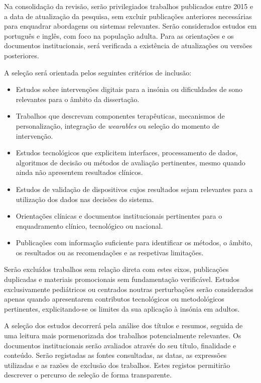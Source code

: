 Na consolidação da revisão, serão privilegiados trabalhos publicados entre 2015 e a data de atualização da pesquisa, sem excluir publicações anteriores necessárias para enquadrar abordagens ou sistemas relevantes. Serão considerados estudos em português e inglês, com foco na população adulta. Para as orientações e os documentos institucionais, será verificada a existência de atualizações ou versões posteriores.

A seleção será orientada pelos seguintes critérios de inclusão:

\begin{itemize}
	\item Estudos sobre intervenções digitais para a insónia ou dificuldades de sono relevantes para o âmbito da dissertação.
	\item Trabalhos que descrevam componentes terapêuticas, mecanismos de personalização, integração de \textit{wearables} ou seleção do momento de intervenção.
    \item Estudos tecnológicos que explicitem interfaces, processamento de dados, algoritmos de decisão ou métodos de avaliação pertinentes, mesmo quando ainda não apresentem resultados clínicos.
	\item Estudos de validação de dispositivos cujos resultados sejam relevantes para a utilização dos dados nas decisões do sistema.
	\item Orientações clínicas e documentos institucionais pertinentes para o enquadramento clínico, tecnológico ou nacional.	
	\item Publicações com informação suficiente para identificar os métodos, o âmbito, os resultados ou as recomendações e as respetivas limitações.
\end{itemize}


Serão excluídos trabalhos sem relação direta com estes eixos, publicações duplicadas e materiais promocionais sem fundamentação verificável. Estudos exclusivamente pediátricos ou centrados noutras perturbações serão considerados apenas quando apresentarem contributos tecnológicos ou metodológicos pertinentes, explicitando-se os limites da sua aplicação à insónia em adultos.

A seleção dos estudos decorrerá pela análise dos títulos e resumos, seguida de uma leitura mais pormenorizada dos trabalhos potencialmente relevantes. Os documentos institucionais serão avaliados através do seu título, finalidade e conteúdo. Serão registadas as fontes consultadas, as datas, as expressões utilizadas e as razões de exclusão dos trabalhos. Estes registos permitirão descrever o percurso de seleção de forma transparente.

